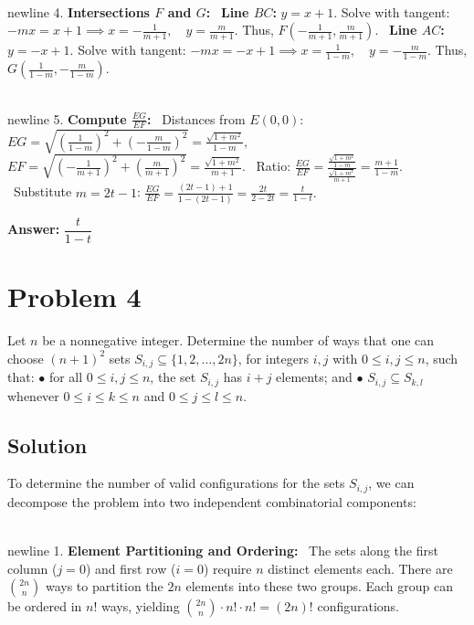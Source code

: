 \documentclass{article}
\begin{document}
\\newline 4. \textbf{Intersections \( F \) and \( G \):}
\noindent \textbullet\ \textbf{Line \( BC \):} \( y = x + 1 \). Solve with tangent:
     \(
     -mx = x + 1 \implies x = -\frac{1}{m + 1}, \quad y = \frac{m}{m + 1}.
     \)
     Thus, \( F\left(-\frac{1}{m + 1}, \frac{m}{m + 1}\right) \).
\noindent \textbullet\ \textbf{Line \( AC \):} \( y = -x + 1 \). Solve with tangent:
     \(
     -mx = -x + 1 \implies x = \frac{1}{1 - m}, \quad y = -\frac{m}{1 - m}.
     \)
     Thus, \( G\left(\frac{1}{1 - m}, -\frac{m}{1 - m}\right) \).

\\newline 5. \textbf{Compute \( \frac{EG}{EF} \):}
\noindent \textbullet\ Distances from \( E(0,0) \):
     \(
     EG = \sqrt{\left(\frac{1}{1 - m}\right)^2 + \left(-\frac{m}{1 - m}\right)^2} = \frac{\sqrt{1 + m^2}}{1 - m},
     \)
     \(
     EF = \sqrt{\left(-\frac{1}{m + 1}\right)^2 + \left(\frac{m}{m + 1}\right)^2} = \frac{\sqrt{1 + m^2}}{m + 1}.
     \)
\noindent \textbullet\ Ratio:
     \(
     \frac{EG}{EF} = \frac{\frac{\sqrt{1 + m^2}}{1 - m}}{\frac{\sqrt{1 + m^2}}{m + 1}} = \frac{m + 1}{1 - m}.
     \)
\noindent \textbullet\ Substitute \( m = 2t - 1 \):
     \(
     \frac{EG}{EF} = \frac{(2t - 1) + 1}{1 - (2t - 1)} = \frac{2t}{2 - 2t} = \frac{t}{1 - t}.
     \)

\textbf{Answer:} \(\boxed{\dfrac{t}{1 - t}}\)
\hrulefill
\newpage
\section*{Problem 4}
Let \(n\) be a nonnegative integer. Determine the number of ways that one can choose \((n+1)^2\) sets \(S_{i,j}\subseteq\{1,2,\ldots,2n\}\), for integers \(i,j\) with \(0\leq i,j\leq n\), such that:
\(\bullet\) for all \(0\leq i,j\leq n\), the set \(S_{i,j}\) has \(i+j\) elements; and
\(\bullet\) \(S_{i,j}\subseteq S_{k,l}\) whenever \(0\leq i\leq k\leq n\) and \(0\leq j\leq l\leq n\).

\subsection*{Solution}
To determine the number of valid configurations for the sets \( S_{i,j} \), we can decompose the problem into two independent combinatorial components:

\\newline 1. \textbf{Element Partitioning and Ordering:}
\noindent \textbullet\ The sets along the first column (\( j=0 \)) and first row (\( i=0 \)) require \( n \) distinct elements each. There are \( \binom{2n}{n} \) ways to partition the \( 2n \) elements into these two groups. Each group can be ordered in \( n! \) ways, yielding \( \binom{2n}{n} \cdot n! \cdot n! = (2n)! \) configurations.
\end{document}
